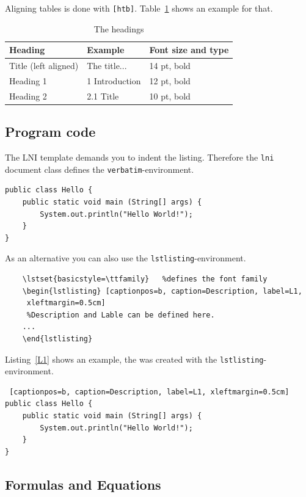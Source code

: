 \documentclass[english]{lni}
\begin{document}
Aligning tables is done with \verb|[htb]|. Table~\ref{tab1} shows an example for that.

\begin{table}[htb]
\centering
\begin{tabular}{l l l}
\hline
Heading & Example & Font size and type \\
\hline
Title (left aligned) & The title... & 14 pt, bold\\
Heading 1 & 1 Introduction & 12 pt, bold\\
Heading 2 & 2.1 Title & 10 pt, bold\\
\hline
\end{tabular}
\caption{The headings}
\label{tab1}
\end{table}

\subsection{Program code}
The LNI template demands you to indent the listing. Therefore the \texttt{lni} document class defines the \texttt{verbatim}-environment.
\begin{verbatim}
public class Hello { 
    public static void main (String[] args) { 
        System.out.println("Hello World!"); 
    } 
} 
\end{verbatim}

As an alternative you can also use the \texttt{lstlisting}-environment.
\begin{verbatim}
	\lstset{basicstyle=\ttfamily}	%defines the font family
	\begin{lstlisting} [captionpos=b, caption=Description, label=L1,
	 xleftmargin=0.5cm]
	 %Description and Lable can be defined here.
	...
	\end{lstlisting}
\end{verbatim}

Listing~\ref{L1} shows an example, the was created with the \texttt{lstlisting}-environment.

\lstset{basicstyle=\ttfamily}
\begin{lstlisting} [captionpos=b, caption=Description, label=L1, xleftmargin=0.5cm]
public class Hello { 
    public static void main (String[] args) { 
        System.out.println("Hello World!"); 
    } 
}
\end{lstlisting}

\subsection{Formulas and Equations}
\end{document}
